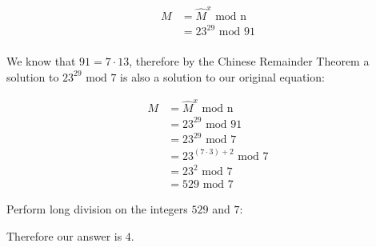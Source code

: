 \documentclass[10pt]{article}
\begin{document}
\begin{align*}
  M &= \hat{M}^x \text{ mod n} \\
    &= 23^{29} \text{ mod 91} \\
\end{align*}

\noindent
We know that $91 = 7 \cdot 13$, therefore by the Chinese Remainder Theorem a solution to
$23^{29} \text{ mod 7}$ is also a solution to our original equation:

\begin{align*}
  M &= \hat{M}^x \text{ mod n} \\
    &= 23^{29} \text{ mod 91} \\
    &= 23^{29} \text{ mod 7} \\
    &= 23^{(7 \cdot 3) + 2} \text{ mod 7} \\
    &= 23^2 \text{ mod 7} \\
    &= 529 \text{ mod 7}
\end{align*}

\noindent
Perform long division on the integers $529$ and $7$:

\spacing

\noindent
Therefore our answer is $4$.
\end{document}
